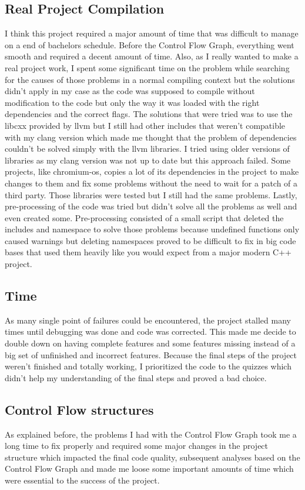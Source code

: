 \documentclass[conference,compsoc]{IEEEtran}
\begin{document}
\subsection{Real Project Compilation}
 I think this project required a major amount of time that was difficult to manage on a end of bachelors
 schedule. Before the Control Flow Graph, everything went smooth and required a decent amount of time.
 Also, as I really wanted to make a real project work, I spent some significant time on the problem while
 searching for the causes of those problems in a normal compiling context but the solutions didn't apply in my case
 as the code was supposed to compile without modification to the code but only the way it was loaded with the right
 dependencies and the correct flags. The solutions that were tried was to use the libcxx provided by llvm but I still
 had other includes that weren't compatible with my clang version which made me thought that the problem of dependencies
 couldn't be solved simply with the llvm libraries. I tried using older versions of libraries as my clang version was
 not up to date but this approach failed. Some projects, like chromium-os, copies a lot of its dependencies in the project
 to make changes to them and fix some problems without the need to wait for a patch of a third party. Those libraries were
 tested but I still had the same problems. Lastly, pre-processing of the code was tried but didn't solve all the problems as
 well and even created some. Pre-processing consisted of a small script that deleted the includes and namespace to solve those
 problems because undefined functions only caused warnings but deleting namespaces proved to be difficult to fix in big code bases
 that used them heavily like you would expect from a major modern C++ project.

\subsection{Time}
As many single point of failures could be encountered, the project stalled many times until debugging was done and code was corrected.
 This made me decide to double down on having complete features and some features missing instead of a big set of unfinished and incorrect features.
 Because the final steps of the project weren't finished and totally working, I prioritized the code to the quizzes which didn't help my understanding
 of the final steps and proved a bad choice.

\subsection{Control Flow structures}
As explained before, the problems I had with the Control Flow Graph took me a long time to fix properly and required
 some major changes in the project structure which impacted the final code quality, subsequent analyses based on the
 Control Flow Graph and made me loose some important amounts of time which were essential to the success of the project.
\end{document}
